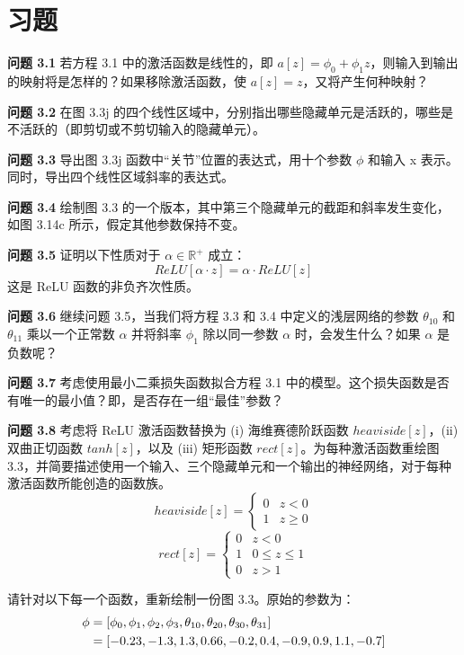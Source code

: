 \documentclass[lang=cn,newtx,10pt,scheme=chinese]{elegantbook}
\begin{document}
\section{习题}
\textbf{问题 3.1} 若方程 3.1 中的激活函数是线性的，即 \(a[z] = \phi_0 + \phi_{1}z\)，则输入到输出的映射将是怎样的？如果移除激活函数，使 \(a[z] = z\)，又将产生何种映射？

\textbf{问题 3.2} 在图 3.3j 的四个线性区域中，分别指出哪些隐藏单元是活跃的，哪些是不活跃的（即剪切或不剪切输入的隐藏单元）。

\textbf{问题 3.3} 导出图 3.3j 函数中“关节”位置的表达式，用十个参数 \(\phi\) 和输入 x 表示。同时，导出四个线性区域斜率的表达式。

\textbf{问题 3.4} 绘制图 3.3 的一个版本，其中第三个隐藏单元的截距和斜率发生变化，如图 3.14c 所示，假定其他参数保持不变。


\textbf{问题 3.5} 证明以下性质对于 \(\alpha \in \mathbb{R}^+\) 成立：
\begin{equation}
ReLU[\alpha \cdot z] = \alpha \cdot ReLU[z] 
\end{equation}
这是 ReLU 函数的非负齐次性质。

\textbf{问题 3.6} 继续问题 3.5，当我们将方程 3.3 和 3.4 中定义的浅层网络的参数 \(\theta_{10}\) 和 \(\theta_{11}\) 乘以一个正常数 \(\alpha\) 并将斜率 \(\phi_1\) 除以同一参数 \(\alpha\) 时，会发生什么？如果 \(\alpha\) 是负数呢？

\textbf{问题 3.7} 考虑使用最小二乘损失函数拟合方程 3.1 中的模型。这个损失函数是否有唯一的最小值？即，是否存在一组“最佳”参数？

\textbf{问题 3.8} 考虑将 ReLU 激活函数替换为 (i) 海维赛德阶跃函数 \(heaviside[z]\)，(ii) 双曲正切函数 \(tanh[z]\)，以及 (iii) 矩形函数 \(rect[z]\)。为每种激活函数重绘图 3.3，并简要描述使用一个输入、三个隐藏单元和一个输出的神经网络，对于每种激活函数所能创造的函数族。
\begin{equation}
heaviside[z] = \begin{cases}
	0 & z < 0 \\
	1 & z \geq 0
\end{cases}
\end{equation}
\begin{equation}
rect[z] = \begin{cases}
	0 & z < 0 \\
	1 & 0 \leq z \leq 1 \\
	0 & z > 1
\end{cases} 
\end{equation}

请针对以下每一个函数，重新绘制一份图 3.3。原始的参数为：
\begin{align}
	\phi &= [\phi_0, \phi_1, \phi_2, \phi_3, \theta_{10}, \theta_{20}, 	\theta_{30}, 	\theta_{31}] \notag \\
	&= [-0.23, -1.3, 1.3, 0.66, -0.2, 0.4, -0.9, 0.9, 1.1, -0.7]
\end{align}
\end{document}
